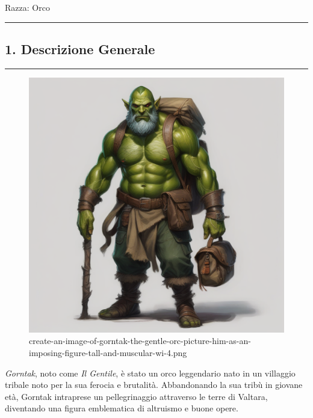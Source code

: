 Razza: Orco

\begin{center}\rule{0.5\linewidth}{0.5pt}\end{center}

\subsection{1. Descrizione Generale}\label{descrizione-generale}

\begin{center}\rule{0.5\linewidth}{0.5pt}\end{center}

\begin{figure}
\centering
\includegraphics{create-an-image-of-gorntak-the-gentle-orc-picture-him-as-an-imposing-figure-tall-and-muscular-wi-4.png}
\caption{create-an-image-of-gorntak-the-gentle-orc-picture-him-as-an-imposing-figure-tall-and-muscular-wi-4.png}
\end{figure}

\emph{Gorntak}, noto come \emph{Il Gentile}, è stato un orco leggendario
nato in un villaggio tribale noto per la sua ferocia e brutalità.
Abbandonando la sua tribù in giovane età, Gorntak intraprese un
pellegrinaggio attraverso le terre di Valtara, diventando una figura
emblematica di altruismo e buone opere.

